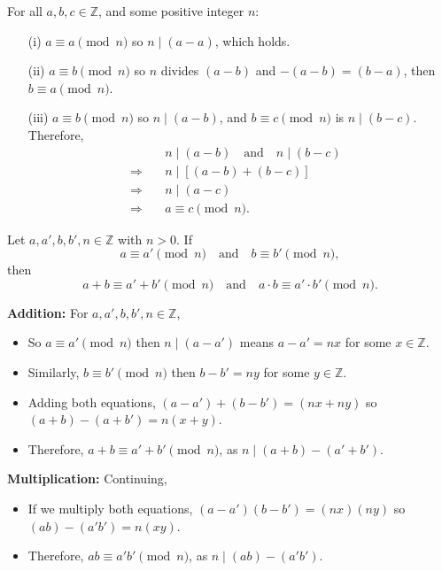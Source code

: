 \newpage

\begin{Proof}
    For all \(a, b, c \in \mathbb{Z}\), and some positive integer $n$:
    \begin{itemize}
        \item[(i)] \( a \equiv a \pmod{n} \) so \( n \mid (a - a) \), which holds.
        \item[(ii)] \( a \equiv b \pmod{n} \) so $n$ divides \((a-b)\) and \(-(a - b)=(b-a) \), then \( b \equiv a \pmod{n} \).
        \item[(iii)] \( a \equiv b \pmod{n} \) so \( n \mid (a - b) \), and \( b \equiv c \pmod{n} \) is  \( n \mid (b - c) \). Therefore,
       \begin{align*}
              &\quad n \mid (a - b) \quad \text{and} \quad n \mid (b - c)& \\
              \Longrightarrow &\quad n \mid [(a - b) + (b - c)]  \\
              \Longrightarrow &\quad n \mid (a - c)  \\
              \Longrightarrow &\quad a \equiv c \pmod{n}.
       \end{align*}
    \end{itemize}
\end{Proof}

\begin{theo}

    Let \(a, a', b, b', n \in \mathbb{Z}\) with \(n > 0\). If
    \[
    a \equiv a' \pmod{n} \quad \text{and} \quad b \equiv b' \pmod{n},
    \]
    then
    \[
    a + b \equiv a' + b' \pmod{n} \quad \text{and} \quad a \cdot b \equiv a' \cdot b' \pmod{n}.
    \]
    
\end{theo}

\begin{Proof}
    
    \textbf{Addition:} For \(a, a', b, b', n \in \mathbb{Z}\),
    \begin{itemize}
        \item So $a\equiv a'\pmod{n}$ then $n\mid(a-a')$ means $a-a'=nx$ for some $x\in\mathbb{Z}$.
        \item Similarly, $b\equiv b'\pmod{n}$ then $b-b'=ny$ for some $y\in\mathbb{Z}$.
        \item Adding both equations, $(a-a')+(b-b')=(nx+ny)$ so $(a+b)-(a+b')=n(x+y)$.
        \item Therefore, $a+b\equiv a'+b'\pmod{n}$, as $n\mid(a+b)-(a'+b')$.
    \end{itemize}
    \textbf{Multiplication:} Continuing,
    \begin{itemize}
        \item If we multiply both equations, $(a-a')(b-b')=(nx)(ny)$ so $(ab)-(a'b')=n(xy)$.
        \item Therefore, $ab\equiv a'b'\pmod{n}$, as $n\mid(ab)-(a'b')$.
    \end{itemize}
     

\end{Proof}


